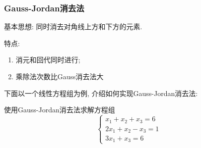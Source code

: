 \subsubsection{Gauss-Jordan消去法}

基本思想: 同时消去对角线上方和下方的元素.

特点:
\begin{enumerate}
    \item 消元和回代同时进行;
    \item 乘除法次数比Gauss消去法大
\end{enumerate}

下面以一个线性方程组为例, 介绍如何实现Gauss-Jordan消去法:

\begin{example}
    使用Gauss-Jordan消去法求解方程组
    \begin{equation*}
        \begin{cases}
            x_1+x_2+x_3=6\\
            2x_1+x_2-x_3=1\\
            3x_1+x_3=6
        \end{cases}
    \end{equation*}
\end{example}

